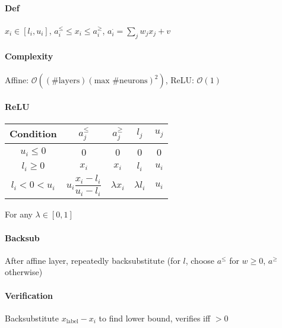 \paragraph{Def} $x_i \in [l_i, u_i]$, $a_i^\le \le x_i \le a_i^\ge$, $a_i^\cdot = \sum_j w_j x_j + v$
\paragraph{Complexity} Affine: $\mathcal{O}(\left(\text{\#layers} \right) \left(\text{max \#neurons}\right)^2)$, ReLU: $\mathcal{O}(1)$
\paragraph{ReLU}
\begin{tabular}[t]{c|c|c|c|c}
    Condition & $a_j^\le$ & $a_j^\ge$ & $l_j$ & $u_j$ \\\midrule
    $u_i \le 0$ & 0 & 0 & 0 & 0 \\
    $l_i \ge 0$ & $x_i$ & $x_i$ & $l_i$ & $u_i$ \\
    $l_i < 0 < u_i$ & $u_i \dfrac{x_i-l_i}{u_i-l_i}$ & $\lambda x_i$ & $\lambda l_i$ & $u_i$ 
\end{tabular}
For any $\lambda \in [0,1]$
\paragraph{Backsub} After affine layer, repeatedly backsubstitute (for $l$, choose $a^\le$ for $w \ge 0$, $a^\ge$ otherwise)
\paragraph{Verification} Backsubstitute $x_\text{label} - x_i$ to find lower bound, verifies iff $> 0$